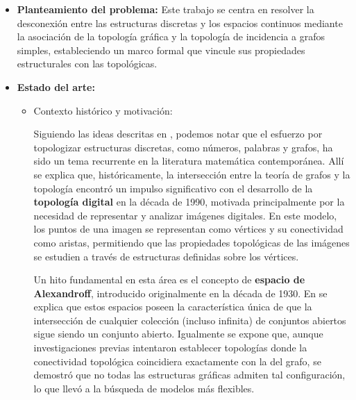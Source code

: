 \documentclass{article}
\begin{document}
\begin{itemize}
          \begin{itemize}
             \item Teoría de grafos: grafos simples y localmente finitos; adyacencia, incidencia; grado de un vértice; isomorfismo de grafos; subgrafos e inducidos; grafos completos, bipartitos, caminos, ciclos, estrellas y árboles; corte de vértices; número cromático. 
             \item Topología general: subbase y base de una topología; espacios de Alexandroff; base minimal y vecindad abierta minimal; compacidad; conexidad; axiomas de separación; continuidad y homeomorfismos; clausura; densidad.
          \end{itemize}
       \item \textbf{Planteamiento del problema:} Este trabajo se centra en resolver la desconexión entre las estructuras discretas y los espacios continuos mediante la asociación de la topología gráfica y la topología de incidencia a grafos simples, estableciendo un marco formal que vincule sus propiedades estructurales con las topológicas.
       \item \textbf{Estado del arte:} 

      \begin{itemize}
       \item Contexto histórico y motivación:

      Siguiendo las ideas descritas en \cite{kilicman2018}, podemos notar que el esfuerzo por topologizar estructuras discretas, como números, palabras y grafos, ha sido un tema recurrente en la literatura matemática contemporánea. Allí se explica que, históricamente, la intersección entre la teoría de grafos y la topología encontró un impulso significativo con el desarrollo de la \textbf{topología digital} en la década de 1990, motivada principalmente por la necesidad de representar y analizar imágenes digitales. En este modelo, los puntos de una imagen se representan como vértices y su conectividad como aristas, permitiendo que las propiedades topológicas de las imágenes se estudien a través de estructuras definidas sobre los vértices.

      Un hito fundamental en esta área es el concepto de \textbf{espacio de Alexandroff}, introducido originalmente en la década de 1930. En \cite{jafarian2013} se explica que estos espacios poseen la característica única de que la intersección de cualquier colección (incluso infinita) de conjuntos abiertos sigue siendo un conjunto abierto. Igualmente se expone que, aunque investigaciones previas intentaron establecer topologías donde la conectividad topológica coincidiera exactamente con la del grafo, se demostró que no todas las estructuras gráficas admiten tal configuración, lo que llevó a la búsqueda de modelos más flexibles.


\end{itemize}
\end{itemize}
\end{document}
